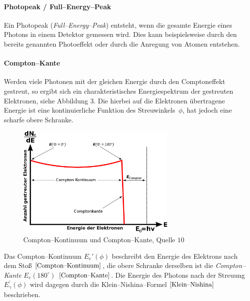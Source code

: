\documentclass[12pt,a4paper]{scrartcl}
\numberwithin{equation}{section} %
\renewcommand{\[}{} %
\renewcommand{\]}{\noindent} %
\begin{document}
\hypertarget{photopeak-fullenergypeak}{%
\paragraph{Photopeak /
Full--Energy--Peak}\label{photopeak-fullenergypeak}}

Ein Photopeak (\emph{Full--Energy--Peak}) entsteht, wenn die gesamte
Energie eines Photons in einem Detektor gemessen wird. Dies kann
beispielsweise durch den bereits genannten Photoeffekt oder durch die
Anregung von Atomen entstehen.

\hypertarget{comptonkante}{%
\paragraph{Compton--Kante}\label{comptonkante}}

Werden viele Photonen mit der gleichen Energie durch den Comptoneffekt
gestreut, so ergibt sich ein charakteristisches Energiespektrum der
gestreuten Elektronen, siehe Abbildung \(3\). Die hierbei auf die
Elektronen übertragene Energie ist eine kontinuierliche Funktion des
Streuwinkels~\(\phi\), hat jedoch eine scharfe obere Schranke.

\begin{figure}
	\centering
	\includegraphics[width=0.7\textwidth]{../media/B3.4/Comptonspektrum.jpg}
	\caption{Compton--Kontinuum und Compton--Kante, Quelle \(10\)}
	\label{abb:Compton-Kante}
\end{figure}

Das Compton--Kontinuum \(E_e'(\phi)\) beschreibt den Energie des
Elektrons nach dem Stoß \(\eqref{Compton--Kontinuum}\), die obere
Schranke derselben ist die \emph{Compton--Kante} \(E_e(180^\circ)\)
\(\eqref{Compton--Kante}\). Die Energie des Photons nach der Streuung
\(E_{\gamma}^\prime(\phi)\) wird dagegen durch die
Klein--Nishina--Formel \(\eqref{Klein--Nishina}\) beschrieben.
\end{document}
